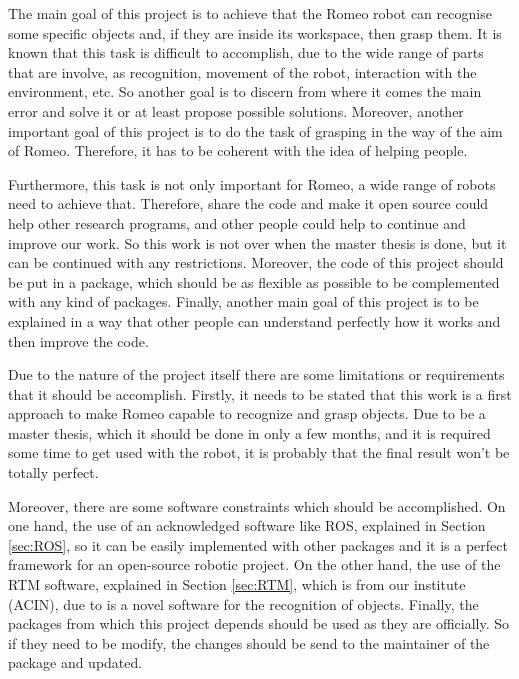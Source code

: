 \documentclass[12pt,a4paper,final,twoside,openright]{report}
\begin{document}
The main goal of this project is to achieve that the Romeo robot can recognise some specific objects and, if they are inside its workspace, then grasp them. It is known that this task is difficult to accomplish, due to the wide range of parts that are involve, as recognition, movement of the robot, interaction with the environment, etc. So another goal is to discern from where it comes the main error and solve it or at least propose possible solutions. Moreover, another important goal of this project is to do the task of grasping in the way of the aim of Romeo. Therefore, it has to be coherent with the idea of helping people.

Furthermore, this task is not only important for Romeo, a wide range of robots need to achieve that. Therefore, share the code and make it open source could help other research programs, and other people could help to continue and improve our work. So this work is not over when the master thesis is done, but it can be continued with any restrictions. Moreover, the code of this project should be put in a package, which should be as flexible as possible to be complemented with any kind of packages. Finally, another main goal of this project is to be explained in a way that other people can understand perfectly how it works and then improve the code.

Due to the nature of the project itself there are some limitations or requirements that it should be accomplish. Firstly, it needs to be stated that this work is a first approach to make Romeo capable to recognize and grasp objects. Due to be a master thesis, which it should be done in only a few months, and it is required some time to get used with the robot, it is probably that the final result won't be totally perfect.

Moreover, there are some software constraints which should be accomplished. On one hand, the use of an acknowledged software like ROS, explained in Section \ref{sec:ROS}, so it can be easily implemented with other packages and it is a perfect framework for an open-source robotic project. On the other hand, the use of the RTM software, explained in Section \ref{sec:RTM}, which is from our institute (ACIN), due to is a novel software for the recognition of objects. Finally, the packages from which this project depends should be used as they are officially. So if they need to be modify, the changes should be send to the maintainer of the package and updated.
\end{document}
